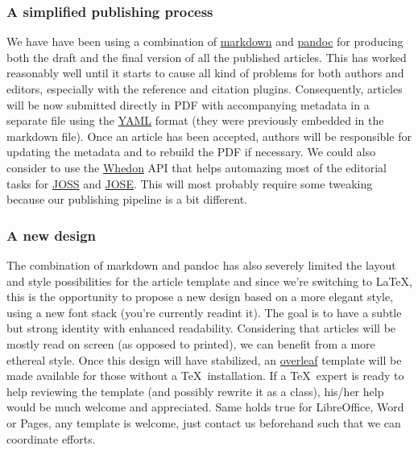 \subsubsection{A simplified publishing process}

We have have been using a combination of
\href{https://daringfireball.net/projects/markdown/syntax}{markdown} and
\href{http://pandoc.org/}{pandoc} for producing both the draft and the final
version of all the published articles. This has worked reasonably well until it
starts to cause all kind of problems for both authors and editors, especially
with the reference and citation plugins. Consequently, articles will be now
submitted directly in PDF with accompanying metadata in a separate file using
the \href{https://en.wikipedia.org/wiki/YAML}{YAML} format (they were
previously embedded in the markdown file). Once an article has been accepted,
authors will be responsible for updating the metadata and to rebuild the PDF if
necessary. We could also consider to use the
\href{https://github.com/openjournals/whedon}{Whedon} API that helps automazing
most of the editorial tasks for \href{http://joss.theoj.org/}{JOSS} and
\href{http://jose.theoj.org/}{JOSE}. This will most probably require some
tweaking because our publishing pipeline is a bit different.


\subsubsection{A new design}

The combination of markdown and pandoc has also severely limited the layout and
style possibilities for the article template and since we're switching to
\LaTeX, this is the opportunity to propose a new design based on a more elegant
style, using a new font stack\supercite{SourceSerifPro:2014, Roboto:2011,
  SourceCodePro:2012} (you're currently readint it). The goal is to have a
subtle but strong identity with enhanced readability. Considering that articles
will be mostly read on screen (as opposed to printed), we can benefit from a
more ethereal style. Once this design will have stabilized, an
\href{https://www.overleaf.com/}{overleaf} template will be made available for
those without a \TeX~installation. If a \TeX~expert is ready to help reviewing
the template (and possibly rewrite it as a class), his/her help would be much
welcome and appreciated. Same holds true for LibreOffice, Word or Pages, any
template is welcome, just contact us beforehand such that we can coordinate
efforts.


